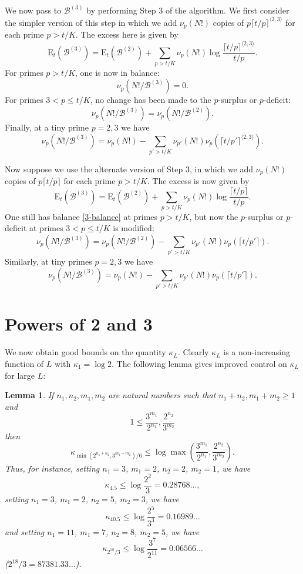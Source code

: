 \documentclass[12pt,a4paper,reqno]{amsart}
\numberwithin{equation}{section}
\theoremstyle{plain}
\newtheorem{lemma}[theorem]{Lemma}
\theoremstyle{definition}
\newcommand\tuple{{\mathcal B}}
\newcommand\excess{{\mathrm{E}}}
\begin{document}
We now pass to $\tuple^{(3)}$ by performing Step 3 of the algorithm.  We first consider the simpler version of this step in which we add $\nu_p(N!)$ copies of $p \lceil t/p\rceil^{\langle 2,3 \rangle}$ for each prime $p > t/K$.  The excess here is given by
\begin{equation}\label{excess-eq}
  \excess_t(\tuple^{(3)}) = \excess_t(\tuple^{(2)}) + \sum_{p > t/K} \nu_p(N!) \log \frac{\lceil t/p \rceil^{\langle 2,3 \rangle}}{t/p}.
\end{equation}
For primes $p >t/K$, one is now in balance:
\begin{equation}\label{3-balance}  
  \nu_p(N!/\tuple^{(3)}) = 0. \end{equation}
For primes $3 < p \leq t/K$, no change has been made to the $p$-surplus or $p$-deficit:
$$ \nu_p(N!/\tuple^{(3)}) = \nu_p(N!/\tuple^{(2)}).$$
Finally, at a tiny prime $p=2,3$ we have
$$ \nu_{p}(N!/\tuple^{(3)}) = \nu_{p}(N!) - \sum_{p' > t/K} \nu_{p'}(N!) \nu_{p}(\lceil t/p' \rceil^{\langle 2,3 \rangle}).$$

Now suppose we use the alternate version of Step 3, in which we add $\nu_p(N!)$ copies of $p \lceil t/p\rceil$ for each prime $p > t/K$.  The excess is now given by
\begin{equation}\label{excess-eq-alt}
  \excess_t(\tuple^{(3)}) = \excess_t(\tuple^{(2)}) + \sum_{p > t/K} \nu_p(N!) \log \frac{\lceil t/p \rceil}{t/p}.
\end{equation}
One still has balance \eqref{3-balance} at primes $p>t/K$, but now the $p$-surplus or $p$-deficit at primes $3 < p \leq t/K$ is modified:
$$ \nu_p(N!/\tuple^{(3)}) = \nu_p(N!/\tuple^{(2)}) -
\sum_{p' > t/K} \nu_{p'}(N!) \nu_{p}(\lceil t/p' \rceil).$$
Similarly, at tiny primes $p=2,3$ we have
$$ \nu_p(N!/\tuple^{(3)}) = \nu_p(N!) -
\sum_{p' > t/K} \nu_{p'}(N!) \nu_{p}(\lceil t/p' \rceil).$$

\section{Powers of 2 and 3}\label{power-sec}

We now obtain good bounds on the quantity $\kappa_L$.  Clearly $\kappa_L$ is a non-increasing function of $L$ with $\kappa_1 = \log 2$.  The following lemma gives improved control on $\kappa_L$ for large $L$:

\begin{lemma}\label{lemcount-0}  If $n_1,n_2,m_1,m_2$ are natural numbers such that $n_1+n_2, m_1+m_2 \geq 1$ and
$$ 1 \leq \frac{3^{m_1}}{2^{n_1}}, \frac{2^{n_2}}{3^{m_2}}$$
then
$$ \kappa_{\min( 2^{n_1+n_2},3^{m_1+m_2})/6} \leq \log \max\left(\frac{3^{m_1}}{2^{n_1}}, \frac{2^{n_2}}{3^{m_2}}\right).$$
Thus, for instance, setting $n_1=3$, $m_1=2$, $n_2=2$, $m_2=1$, we have
$$ \kappa_{4.5} \leq \log \frac{2^2}{3} = 0.28768\dots,$$
setting $n_1 = 3$, $m_1 = 2$, $n_2 = 5$, $m_2 = 3$, we have
$$\kappa_{40.5} \leq \log \frac{2^5}{3^3} = 0.16989\dots$$ 
and setting $n_1 = 11$, $m_1 = 7$, $n_2 = 8$, $m_2 = 5$, we have 
$$\kappa_{2^{18}/3} \leq \log \frac{3^7}{2^{11}} = 0.06566\dots$$
($2^{18}/3 = 87381.33\dots$).
\end{lemma}
\end{document}
